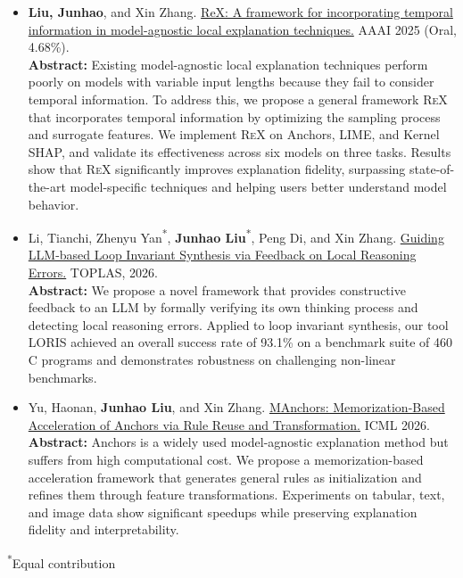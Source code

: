 \documentclass[letterpaper,11pt]{article}
\begin{document}
\begin{itemize}[leftmargin=*]
    \item \textbf{Liu, Junhao}, and Xin Zhang. \href{https://ojs.aaai.org/index.php/AAAI/article/view/34079}{ReX: A framework for incorporating temporal information in model-agnostic local explanation techniques.} AAAI 2025 (Oral, 4.68\%).\vspace{0.2cm}\\
        {\small \textbf{Abstract:} Existing model-agnostic local explanation techniques perform poorly on models with variable input lengths because they fail to consider temporal information. To address this, we propose a general framework \textsc{ReX} that incorporates temporal information by optimizing the sampling process and surrogate features. We implement \textsc{ReX} on Anchors, LIME, and Kernel SHAP, and validate its effectiveness across six models on three tasks. Results show that \textsc{ReX} significantly improves explanation fidelity, surpassing state-of-the-art model-specific techniques and helping users better understand model behavior.}

    \item Li, Tianchi, Zhenyu Yan\textsuperscript{*}, \textbf{Junhao Liu}\textsuperscript{*}, Peng Di, and Xin Zhang. \href{https://dl.acm.org/doi/10.1145/3806652}{Guiding LLM-based Loop Invariant Synthesis via Feedback on Local Reasoning Errors.} TOPLAS, 2026.\vspace{0.2cm}\\
        {\small \textbf{Abstract:} We propose a novel framework that provides constructive feedback to an LLM by formally verifying its own thinking process and detecting local reasoning errors. Applied to loop invariant synthesis, our tool LORIS achieved an overall success rate of 93.1\% on a benchmark suite of 460 C programs and demonstrates robustness on challenging non-linear benchmarks.}

    \item Yu, Haonan, \textbf{Junhao Liu}, and Xin Zhang. \href{https://arxiv.org/abs/2502.11068}{MAnchors: Memorization-Based Acceleration of Anchors via Rule Reuse and Transformation.} ICML 2026.\vspace{0.2cm}\\
        {\small \textbf{Abstract:} Anchors is a widely used model-agnostic explanation method but suffers from high computational cost. We propose a memorization-based acceleration framework that generates general rules as initialization and refines them through feature transformations. Experiments on tabular, text, and image data show significant speedups while preserving explanation fidelity and interpretability.}
\end{itemize}
\vspace{-8pt}
{\small \hfill \textsuperscript{*}Equal contribution}
\end{document}
